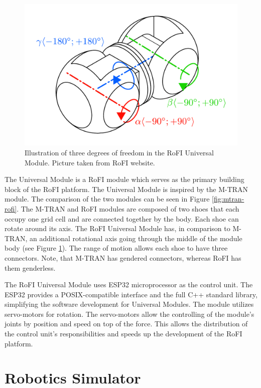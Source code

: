 \documentclass[
  printed, %
  color,   %
  notable, %
  oneside, %
  nolof,   %
  nolot,   %
  nocover,
]{fithesis3}
\begin{document}
\begin{figure}
    \centering
    \includegraphics[height=.4\textheight]{data/rofi_universal_module_dof.pdf}
    \caption{Illustration of three degrees of freedom in the RoFI Universal Module. Picture taken from RoFI website\cite{rofi-web}.}
    \label{fig:univ-module-dof}
\end{figure}

The Universal Module is a RoFI module which serves as the primary building block of the RoFI platform.
The Universal Module is inspired by the M-TRAN\cite{mtran} module.
The comparison of the two modules can be seen in Figure \ref{fig:mtran-rofi}.
The M-TRAN and RoFI modules are composed of two shoes that each occupy one grid cell and are connected together by the body.
Each shoe can rotate around its axis.
The RoFI Universal Module has, in comparison to M-TRAN, an additional rotational axis going through the middle of the module body (see Figure \ref{fig:univ-module-dof}).
The range of motion allows each shoe to have three connectors.
Note, that M-TRAN has gendered connectors, whereas RoFI has them genderless.

The RoFI Universal Module uses ESP32 microprocessor as the control unit.
The ESP32 provides a POSIX-compatible interface and the full C++ standard library, simplifying the software development for Universal Modules.
The module utilizes servo-motors for rotation.
The servo-motors allow the controlling of the module's joints by position and speed on top of the force.
This allows the distribution of the control unit's responsibilities and speeds up the development of the RoFI platform.


\chapter{Robotics Simulator}
\end{document}
